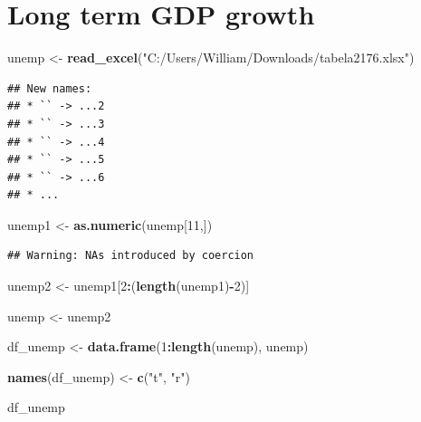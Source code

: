 \documentclass[]{article}
\newenvironment{Shaded}{\begin{snugshade}}{\end{snugshade}}
\newcommand{\DecValTok}[1]{\textcolor[rgb]{0.00,0.00,0.81}{#1}}
\newcommand{\KeywordTok}[1]{\textcolor[rgb]{0.13,0.29,0.53}{\textbf{#1}}}
\newcommand{\NormalTok}[1]{#1}
\newcommand{\OperatorTok}[1]{\textcolor[rgb]{0.81,0.36,0.00}{\textbf{#1}}}
\newcommand{\StringTok}[1]{\textcolor[rgb]{0.31,0.60,0.02}{#1}}
\begin{document}
\section{Long term GDP growth}

\begin{Shaded}
\begin{Highlighting}[]
\NormalTok{unemp <-}\StringTok{ }\KeywordTok{read_excel}\NormalTok{(}\StringTok{"C:/Users/William/Downloads/tabela2176.xlsx"}\NormalTok{)}
\end{Highlighting}
\end{Shaded}

\begin{verbatim}
## New names:
## * `` -> ...2
## * `` -> ...3
## * `` -> ...4
## * `` -> ...5
## * `` -> ...6
## * ...
\end{verbatim}

\begin{Shaded}
\begin{Highlighting}[]
\NormalTok{unemp1 <-}\StringTok{ }\KeywordTok{as.numeric}\NormalTok{(unemp[}\DecValTok{11}\NormalTok{,])}
\end{Highlighting}
\end{Shaded}

\begin{verbatim}
## Warning: NAs introduced by coercion
\end{verbatim}

\begin{Shaded}
\begin{Highlighting}[]
\NormalTok{unemp2 <-}\StringTok{ }\NormalTok{unemp1[}\DecValTok{2}\OperatorTok{:}\NormalTok{(}\KeywordTok{length}\NormalTok{(unemp1)}\OperatorTok{-}\DecValTok{2}\NormalTok{)]}

\NormalTok{unemp <-}\StringTok{ }\NormalTok{unemp2}

\NormalTok{df_unemp <-}\StringTok{ }\KeywordTok{data.frame}\NormalTok{(}\DecValTok{1}\OperatorTok{:}\KeywordTok{length}\NormalTok{(unemp), unemp)}

\KeywordTok{names}\NormalTok{(df_unemp) <-}\StringTok{ }\KeywordTok{c}\NormalTok{(}\StringTok{"t"}\NormalTok{, }\StringTok{"r"}\NormalTok{)}

\NormalTok{df_unemp}
\end{Highlighting}
\end{Shaded}
\end{document}

